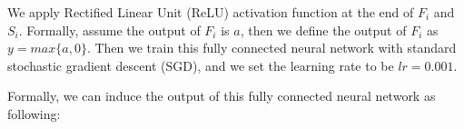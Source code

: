 We apply Rectified Linear Unit (ReLU) activation function at the end of $F_i$ and $S_i$. Formally, assume the output of $F_i$ is $a$, then we define the output of $F_i$ as $y=max\{a, 0\}$. Then we train this fully connected neural network with standard stochastic gradient descent (SGD), and we set the learning rate to be $lr=0.001$. 

Formally, we can induce the output of this fully connected neural network as following:

